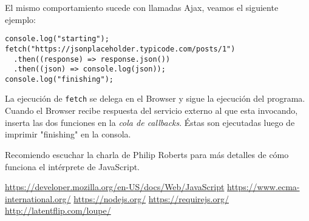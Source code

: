 \documentclass[a4paper, oneside, titlepage, 12pt]{paper}
\begin{document}
El mismo comportamiento sucede con llamadas Ajax, veamos el siguiente ejemplo:

\begin{verbatim}
console.log("starting");
fetch("https://jsonplaceholder.typicode.com/posts/1")
  .then((response) => response.json())
  .then((json) => console.log(json));
console.log("finishing");
\end{verbatim}

La ejecución de \texttt{fetch} se delega en el Browser y sigue la ejecución del programa. Cuando el Browser recibe respuesta del servicio externo al que esta invocando, inserta las dos funciones en la \textit{cola de callbacks}. Éstas son ejecutadas luego de imprimir "finishing" en la consola.
\newline

Recomiendo escuchar la charla de Philip Roberts\cite{loupe} para más detalles de cómo funciona el intérprete de JavaScript.


\begin{thebibliography}{100} %
 \url{https://developer.mozilla.org/en-US/docs/Web/JavaScript}
 \url{https://www.ecma-international.org/}
 \url{https://nodejs.org/}
 \url{https://requirejs.org/}
 \url{http://latentflip.com/loupe/}
\end{thebibliography}
\end{document}
